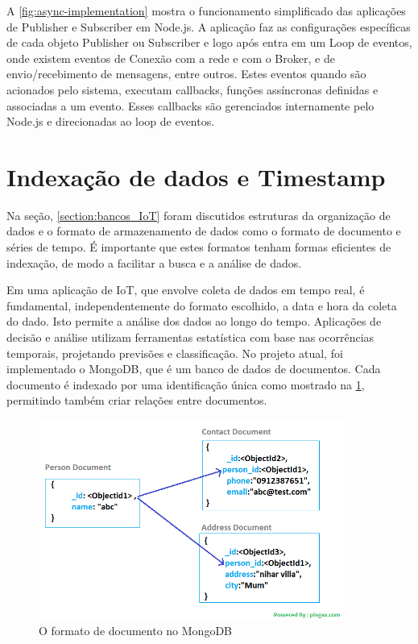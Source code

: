 A \ref{fig:async-implementation} mostra o funcionamento simplificado das aplicações de Publisher e Subscriber em Node.js. A aplicação faz as configurações específicas de cada objeto Publisher ou Subscriber e logo após entra em um Loop de eventos, onde existem eventos de Conexão com a rede e com o Broker, e de envio/recebimento de mensagens, entre outros. Estes eventos quando são acionados pelo sistema, executam callbacks, funções assíncronas definidas e associadas a um evento. Esses callbacks são gerenciados internamente pelo Node.js e direcionadas ao loop de eventos.

\section{Indexação de dados e Timestamp}
\label{section:timestamp}

Na seção, \ref{section:bancos_IoT} foram discutidos estruturas da organização de dados e o formato de armazenamento de dados como o formato de documento e séries de tempo. É importante que estes formatos tenham formas eficientes de indexação, de modo a facilitar a busca e a análise de dados.

Em uma aplicação de IoT, que envolve coleta de dados em tempo real, é fundamental, independentemente do formato escolhido, a data e hora da coleta do dado. Isto permite a análise dos dados ao longo do tempo. Aplicações de decisão e análise utilizam ferramentas estatística com base nas ocorrências temporais, projetando previsões e classificação. No projeto atual, foi implementado o MongoDB, que é um banco de dados de documentos. Cada documento é indexado por uma identificação única como mostrado na \ref{fig:document-model}, permitindo também criar relações entre documentos.

\begin{figure}[h!]
\centering
\includegraphics[width=10cm]{./02_Capitulos/02_Cap3/figures/document-model}
\caption{O formato de documento no MongoDB}
\label{fig:document-model}
\end{figure}

